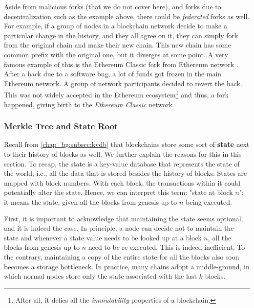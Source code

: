 Aside from malicious forks (that we do not cover here), and forks due to decentralization such as
the example above, there could be \textit{federated} forks as well. For example, if a group of nodes
in a blockchain network decide to make a particular change in the history, and they all agree on it,
they can simply fork from the original chain and make their new chain. This new chain has some
common prefix with the original one, but it diverges at some point. A very famous example of this is
the Ethereum Classic fork from Ethereum network \cite{vignaGreatDigitalCurrencyDebate2016}. After a
hack due to a software bug, a lot of funds got frozen in the main Ethereum network. A group of
network participants decided to revert the hack. This was not widely accepted in the Ethereum
ecosystem\footnote{After all, it defies all the \textit{immutability} properties of a blockchain.}
and thus, a fork happened, giving birth to the \textit{Ethereum Classic} network.



\subsubsection{Merkle Tree and State Root} \label{chap_bg:subsec:trie}

Recall from \ref{chap_bg:subsec:kvdb} that blockchains store some sort of \textbf{state}
next to their history of blocks as well. We further explain the reasons for this in this section. To recap,
the state is a key-value database that represents the state of the world, i.e., all the data that is
stored besides the history of blocks. States are mapped with block numbers. With each block, the
transactions within it could potentially alter the state. Hence, we can interpret this term: "state
at block $n$": it means the  state, given all the blocks from genesis up to $n$ being
executed.

First, it is important to acknowledge that maintaining the state seems optional, and it is indeed
the case. In principle, a node can decide not to maintain the state and whenever a state value needs
to be looked up at a block $n$, all the blocks from genesis up to $n$ need to be re-executed. This
is indeed inefficient. To the contrary, maintaining a copy of the entire state for all the blocks
also soon becomes a storage bottleneck. In practice, many chains adopt a middle-ground, in which
normal nodes store only the state associated with the last $k$ blocks.

